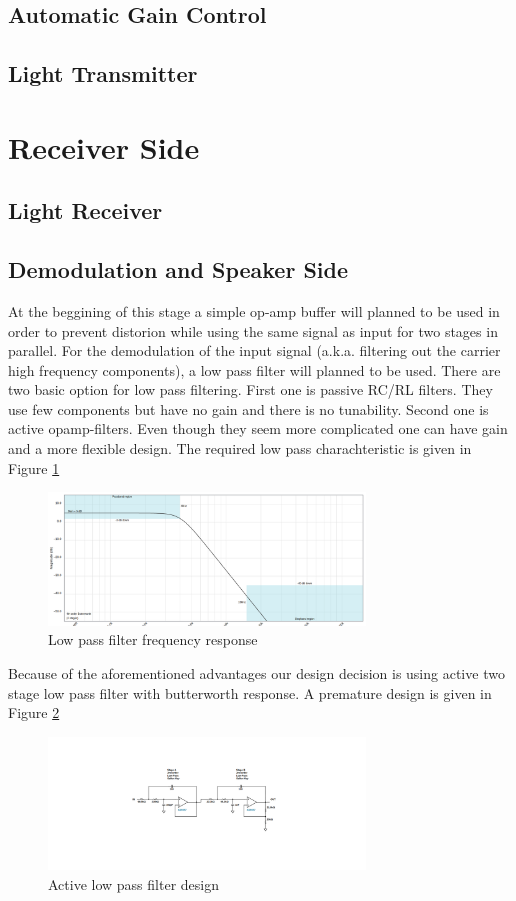 \documentclass[a4paper,10pt]{article}
\begin{document}
\subsection{Automatic Gain Control}
\subsection{Light Transmitter}
\section{Receiver Side}
\subsection{Light Receiver}
\subsection{Demodulation and Speaker Side}
At the beggining of this stage a simple op-amp buffer will planned to be used in order to prevent distorion while using the same signal as input for two stages in parallel. For the demodulation of the input signal (a.k.a. filtering out the carrier high frequency components), a low pass filter will planned to be used. There are two basic  option for low pass filtering. First one is passive RC/RL filters. They use few components but have no gain and there is no tunability. Second one is active opamp-filters. Even though they seem more complicated one can have gain and a more flexible design. The required low pass charachteristic is given in Figure \ref*{low_pass_plot}
\begin{figure}[H]
    \centering
    \includegraphics[width = 0.75\textwidth]{active_low_pass.png}
    \caption{Low pass filter frequency response}
    \label{low_pass_plot}    
\end{figure} 
Because of the aforementioned advantages our design decision is using active two stage low pass filter with butterworth response. A premature design is given in Figure \ref*{low_pass_sch}
\begin{figure}[H]
    \centering
    \includegraphics[width = 0.75\textwidth]{active_low_pass_circuit.png}
    \caption{Active low pass filter design}
    \label{low_pass_sch}    
\end{figure} 
\end{document}
